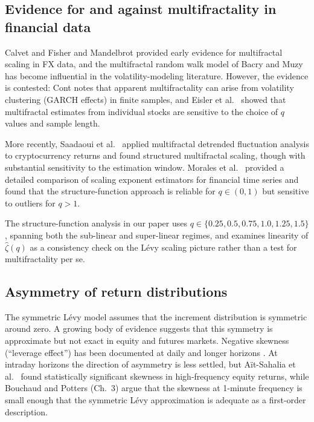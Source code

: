 \documentclass[12pt,a4paper]{article}
\begin{document}
\subsection{Evidence for and against multifractality in financial data}

Calvet and Fisher \cite{Calvet1997} and Mandelbrot \cite{Mandelbrot1997} provided early evidence
for multifractal scaling in FX data, and the multifractal random walk model of
Bacry and Muzy \cite{BacryMuzy2003} has become influential in the volatility-modeling
literature. However, the evidence is contested: Cont \cite{Cont2001} notes that
apparent multifractality can arise from volatility clustering (GARCH effects)
in finite samples, and Eisler et al.\ \cite{Eisler2004} showed that multifractal estimates
from individual stocks are sensitive to the choice of $q$ values and sample length.

More recently, Saadaoui et al.\ \cite{Saadaoui2024} applied multifractal detrended
fluctuation analysis to cryptocurrency returns and found structured multifractal
scaling, though with substantial sensitivity to the estimation window.
Morales et al.\ \cite{Morales2012} provided a detailed comparison of scaling exponent
estimators for financial time series and found that the structure-function
approach is reliable for $q \in (0,1)$ but sensitive to outliers for $q > 1$.

The structure-function analysis in our paper uses $q \in \{0.25, 0.5, 0.75,
1.0, 1.25, 1.5\}$, spanning both the sub-linear and super-linear regimes, and
examines linearity of $\hat\zeta(q)$ as a consistency check on the Lévy
scaling picture rather than a test for multifractality per se.

\subsection{Asymmetry of return distributions}

The symmetric Lévy model assumes that the increment distribution is symmetric
around zero. A growing body of evidence suggests that this symmetry is
approximate but not exact in equity and futures markets. Negative skewness
(``leverage effect'') has been documented at daily and longer horizons
\cite{Cont2001,Bouchaud2001}. At intraday horizons the direction of
asymmetry is less settled, but Aït-Sahalia et al.\ \cite{Ait-Sahalia2002} found statistically
significant skewness in high-frequency equity returns, while
Bouchaud and Potters \cite{BouchaudPotters2003} (Ch.~3) argue that the skewness at 1-minute
frequency is small enough that the symmetric Lévy approximation is adequate as
a first-order description.
\end{document}

